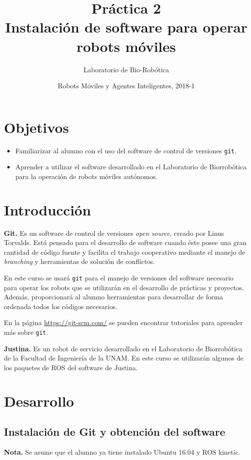 \documentclass[letterpaper,12pt]{article}
\title{Práctica 2 \\ Instalación de software para operar robots móviles}
\author{Laboratorio de Bio-Robótica}
\date{Robots Móviles y Agentes Inteligentes, 2018-1}
\begin{document}
\renewcommand{\tablename}{Tabla}
\maketitle
\section*{Objetivos}
\begin{itemize}
\item Familiarizar al alumno con el uso del software de control de versiones \texttt{git}.
\item Aprender a utilizar el software desarrollado en el Laboratorio de Biorrobótica para la operación de robots móviles autónomos. 
\end{itemize}

\section{Introducción}
\textbf{Git.} Es un software de control de versiones \textit{open source}, creado por Linus Torvalds. Está pensado para el desarrollo de software cuando éste posee una gran cantidad de código fuente y facilita el trabajo cooperativo mediante el manejo de \textit{branching} y herramientas de solución de conflictos. 

En este curso se usará \texttt{git} para el manejo de versiones del software necesario para operar los robots que se utilizarán en el desarrollo de prácticas y proyectos. Además, proporcionará al alumno herramientas para desarrollar de forma ordenada todos los códigos necesarios.

En la página \url{https://git-scm.com/} se pueden encontrar tutoriales para aprender más sobre \texttt{git}.

\textbf{Justina.} Es un robot de servicio desarrollado en el Laboratorio de Biorrobótica de la Facultad de Ingeniería de la UNAM. En este curso se utilizarán algunos de los paquetes de ROS del software de Justina. 

\section{Desarrollo}
\subsection{Instalación de Git y obtención del software}
\textbf{Nota.} Se asume que el alumno ya tiene instalado Ubuntu 16.04 y ROS kinetic. 
\end{document}
